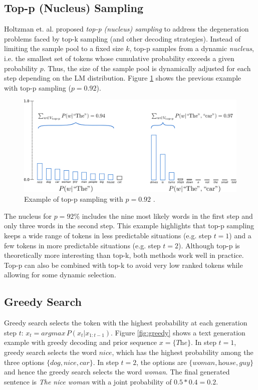 \subsection{Top-p (Nucleus) Sampling}

Holtzman et. al. \cite{holtzman2019curious} proposed \textit{top-p (nucleus) sampling} to address the degeneration problems faced by top-k sampling (and other decoding strategies). Instead of limiting the sample pool to a fixed size $k$, top-p samples from a dynamic \textit{nucleus}, i.e. the smallest set of tokens whose cumulative probability exceeds a given probability $p$. Thus, the size of the sample pool is dynamically adjusted for each step depending on the LM distribution. Figure \ref{fig:topp} shows the previous example with top-p sampling ($p=0.92$).

\begin{figure}[!h]
 \centering
 \includegraphics[width=0.9\columnwidth]{imgs/background/topp.png}
 \caption{Example of top-p sampling with $p=0.92$ \cite{platen2020}.}
 \label{fig:topp}
\end{figure}

The nucleus for $p=92\%$ includes the nine most likely words in the first step and only three words in the second step. This example highlights that top-p sampling keeps a wide range of tokens in less predictable situations (e.g. step $t=1$) and a few tokens in more predictable situations (e.g. step $t=2$). Although top-p is theoretically more interesting than top-k, both methods work well in practice. Top-p can also be combined with top-k to avoid very low ranked tokens while allowing for some dynamic selection.

\subsection{Greedy Search}

Greedy search selects the token with the highest probability at each generation step $t$: $x_t = argmax \, P(x_t|x_{1:t-1})$. Figure \ref{fig:greedy} shows a text generation example with greedy decoding and prior sequence $x = \{\textit{The}\}$.
In step $t=1$, greedy search selects the word $\textit{nice}$, which has the highest probability among the three options $\{ \textit{dog}, \textit{nice}, \textit{car} \}$. In step $t=2$, the options are $\{ \textit{woman}, \textit{house}, \textit{guy} \}$ and hence the greedy search selects the word \textit{woman}. The final generated sentence is \textit{The nice woman} with a joint probability of $0.5*0.4=0.2$.

